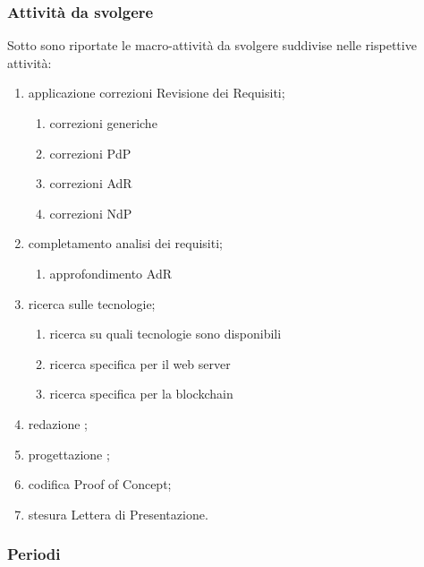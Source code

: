 \subsubsection{Attività da svolgere}
Sotto sono riportate le macro-attività da svolgere suddivise nelle rispettive attività:
\begin{enumerate}
	\item applicazione correzioni Revisione dei Requisiti;
	\begin{enumerate}
		\item correzioni generiche
		\item correzioni PdP
		\item correzioni AdR
		\item correzioni NdP
	\end{enumerate}
	\item completamento analisi dei requisiti;
	\begin{enumerate}
		\item approfondimento AdR
	\end{enumerate}
	\item ricerca sulle tecnologie;
	\begin{enumerate}
		\item ricerca su quali tecnologie sono disponibili
		\item ricerca specifica per il web server
		\item ricerca specifica per la blockchain
	\end{enumerate}
	\item redazione ;
	\item progettazione ;
	\item codifica Proof of Concept;
	\item stesura Lettera di Presentazione.
\end{enumerate}

\subsubsection{Periodi}

